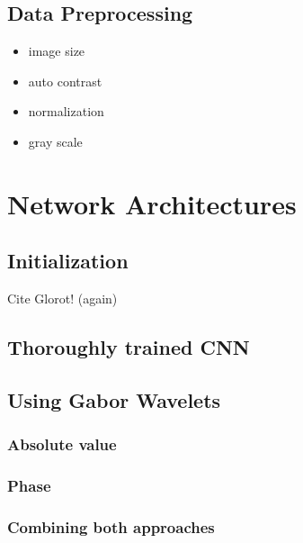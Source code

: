 \documentclass[11pt, a4paper]{article}
\begin{document}
\begin{itemize}
\subsection{Data Preprocessing}

\begin{itemize}
\item image size
\item auto contrast
\item normalization
\item gray scale
\end{itemize}

\newpage


\section{Network Architectures}

\subsection{Initialization}

Cite Glorot! (again)

\subsection{Thoroughly trained CNN}

\subsection{Using Gabor Wavelets}

\subsubsection{Absolute value}
\subsubsection{Phase}
\subsubsection{Combining both approaches}


\end{itemize}
\end{document}
